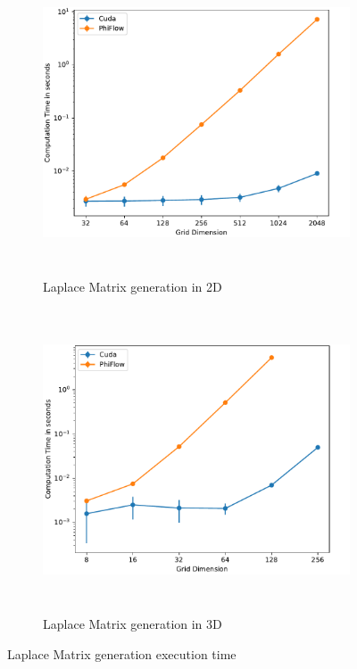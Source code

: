\begin{figure}[t]
\centering
	\begin{subfigure}[b]{1\textwidth}
		\centering
		\includegraphics[height=9cm, width=14cm]{figures/laplace_2d}

		\caption{Laplace Matrix generation in 2D}
	\end{subfigure}
	\begin{subfigure}[b]{1\textwidth}
		\centering
		\includegraphics[height=9cm, width=14cm]{figures/laplace_3d}

		\caption{Laplace Matrix generation in 3D}
	\end{subfigure}

\caption{Laplace Matrix generation execution time} \label{fig:perfbs16}
\end{figure}
